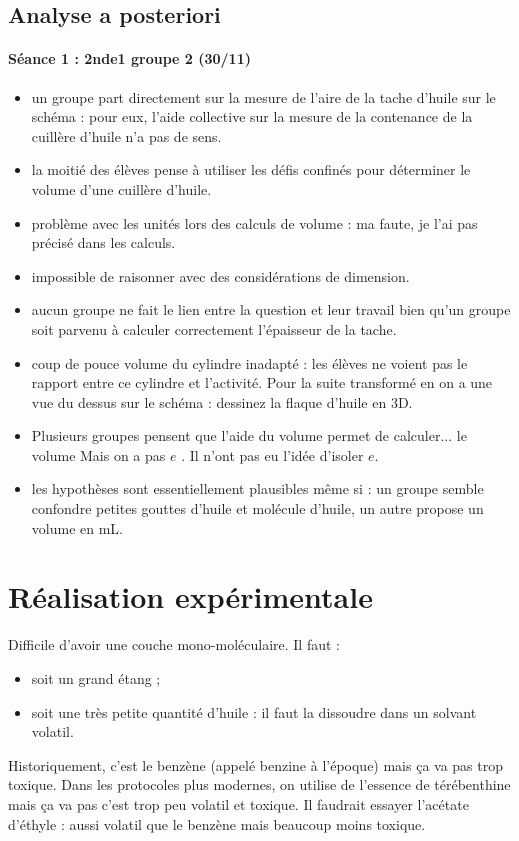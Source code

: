 \documentclass[12pt,a4paper]{article}
\begin{document}
\subsection{Analyse a posteriori}

\paragraph{Séance 1 : 2nde1 groupe 2 (30/11)}
\begin{itemize}
\item un groupe part directement sur la mesure de l'aire de la tache d'huile sur le schéma : pour eux, l'aide collective sur la mesure de la contenance de la cuillère d'huile n'a pas de sens.
\item la moitié des élèves pense à utiliser les défis confinés pour déterminer le volume d'une cuillère d'huile.
\item problème avec les unités lors des calculs de volume : ma faute, je l'ai pas précisé dans les calculs.
\item impossible de raisonner avec des considérations de dimension.
\item aucun groupe ne fait le lien entre la question et leur travail bien qu'un groupe soit parvenu à calculer correctement l'épaisseur de la tache.
\item coup de pouce volume du cylindre inadapté : les élèves ne voient pas le rapport entre ce cylindre et l'activité. Pour la suite transformé en \og on a une vue du dessus sur le schéma : dessinez la flaque d'huile en 3D. \fg{}
\item Plusieurs groupes pensent que l'aide du volume permet de calculer... le volume \og Mais on a pas $e$ \fg{}.
Il n'ont pas eu l'idée d'isoler $e$. 
\item les hypothèses sont essentiellement plausibles même si : un groupe semble confondre petites gouttes d'huile et molécule d'huile, un autre propose un volume en mL.
\end{itemize}


\newpage
\section{Réalisation expérimentale}

Difficile d'avoir une couche mono-moléculaire.
Il faut :
\begin{itemize}
\item soit un grand étang ;
\item soit une très petite quantité d'huile : il faut la dissoudre dans un solvant volatil.
\end{itemize}
Historiquement, c'est le benzène (appelé benzine à l'époque) mais ça va pas trop toxique.
Dans les protocoles plus modernes, on utilise de l'essence de térébenthine mais ça va pas c'est trop peu volatil et toxique.
Il faudrait essayer l'acétate d'éthyle : aussi volatil que le benzène mais beaucoup moins toxique.
 
\end{document}
